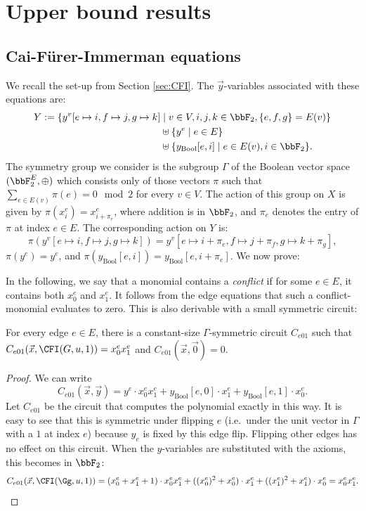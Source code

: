 \documentclass[a4paper,UKenglish,cleveref, autoref, thm-restate]{lipics-v2021}
\begin{document}
\section{Upper bound results }


\subsection{Cai-Fürer-Immerman equations}
We recall the set-up from Section \ref{sec:CFI}.
\CFIdefinition*
The $\vec y$-variables associated with these equations are:
\begin{align*}
	Y := \{ y^v[e \mapsto i,f \mapsto j,g \mapsto k] &\mid v \in V, i,j,k \in \bbF_2, \{e,f,g\} = E(v)   \} \\
	& \uplus \{ y^e \mid e \in E \} \\
	& \uplus \{ y_{\text{Bool}}[e,i] \mid e \in E(v), i \in \bbF_2  \}  .
\end{align*}
The symmetry group we consider is the subgroup $\Gamma$ of the Boolean vector space $(\bbF_2^{E}, \oplus)$ which consists only of those vectors $\pi$ such that $\sum_{e \in E(v)} \pi(e) = 0 \mod 2$ for every $v \in V$. 
The action of this group on $X$ is given by $\pi(x^e_i) = x^e_{i+\pi_e}$, where addition is in $\bbF_2$, and $\pi_e$ denotes the entry of $\pi$ at index $e \in E$. 
The corresponding action on $Y$ is:
\[
\pi(y^v[e \mapsto i,f \mapsto j,g \mapsto k]) = y^v[e \mapsto i+\pi_{e},f \mapsto j+\pi_{f},g \mapsto k+\pi_{g}],
\]
$\pi(y^e) = y^e$, and $\pi(y_{\text{Bool}}[e,i]) = y_{\text{Bool}}[e,i+\pi_e]$. We now prove:


\CFIupperbound*



In the following, we say that a monomial contains a \emph{conflict} if for some $e \in E$, it contains both $x^e_0$ and $x^e_1$. It follows from the edge equations that such a conflict-monomial evaluates to zero. This is also derivable with a small symmetric circuit:
\begin{lemma}
	\label{lem:symmetricCircuitForE01}
	For every edge $e \in E$, there is a constant-size $\Gamma$-symmetric circuit $C_{e01}$ such that $C_{e01}(\vec x, \CFI(G, u, 1)) = x^e_0x^e_1$ and $C_{e01}(\vec x, \vec 0) = 0$.
\end{lemma}
\begin{proof}
	We can write
	\[
	C_{e01}(\vec x, \vec y) = y^e \cdot x^e_0x^e_1 + y_{\text{Bool}}[e,0] \cdot x^e_1 + y_{\text{Bool}}[e,1] \cdot x^e_0.
	\]
	Let $C_{e01}$ be the circuit that computes the polynomial exactly in this way.
	It is easy to see that this is symmetric under flipping $e$ (i.e.\ under the unit vector in $\Gamma$ with a $1$ at index $e$) because $y_e$ is fixed by this edge flip. Flipping other edges has no effect on this circuit. When the $y$-variables are substituted with the axioms, this becomes in $\bbF_2$:
	\[
	C_{e01}(\vec x,  \CFI(\Gg, u, 1)) = (x^e_0 + x^e_1 +1) \cdot x^e_0x^e_1  + ((x^e_0)^2 + x^e_0) \cdot x^e_1 + ((x^e_1)^2 + x^e_1) \cdot x^e_0 =  x^e_0x^e_1\\.
	\]
\end{proof}	
\end{document}
